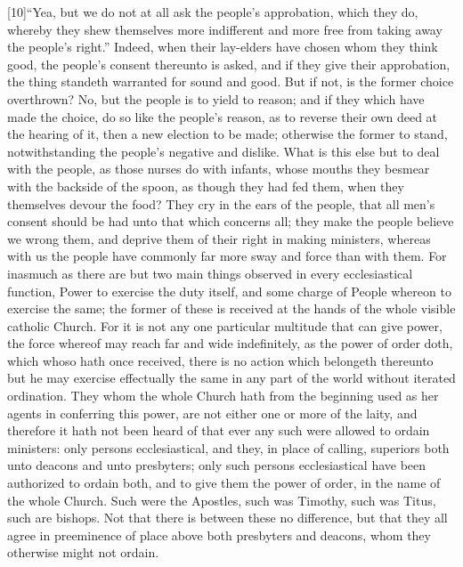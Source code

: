 [10]“Yea, but we do not at all ask the people’s approbation,  which they do, whereby they shew themselves more indifferent and more free from taking away the people’s right.” Indeed, when their lay-elders have chosen whom they think good, the people’s consent thereunto is asked, and if they give their approbation, the thing standeth warranted for sound and good. But if not, is the former choice overthrown? No, but the people is to yield to reason; and if they which have made the choice, do so like the people’s reason, as to reverse their own deed at the hearing of it, then a new election to be made; otherwise the former to stand, notwithstanding the people’s negative and dislike. What is this else but to deal with the people, as those nurses do with infants, whose mouths they besmear with the backside of the spoon, as though they had fed them, when they themselves devour the food? They cry in the ears of the people, that all men’s consent should be had unto that which concerns all; they make the people believe we wrong them, and deprive them of their right in making ministers, whereas with us the people have commonly far more sway and force than with them. For inasmuch as there are but two main things observed in every ecclesiastical function, Power to exercise the duty itself, and some charge of People whereon to exercise the same; the former of these is received at the hands of the whole visible catholic Church. For it is not any one particular multitude that can give power, the force whereof may reach far and wide indefinitely, as the power of order doth, which whoso hath once received, there is no action which belongeth thereunto but he may exercise effectually the same in any part of the world without iterated  ordination. They whom the whole Church hath from the beginning used as her agents in conferring this power, are not either one or more of the laity, and therefore it hath not been heard of that ever any such were allowed to ordain ministers: only persons ecclesiastical, and they, in place of calling, superiors both unto deacons and unto presbyters; only such persons ecclesiastical have been authorized to ordain both, and to give them the power of order, in the name of the whole Church. Such were the Apostles, such was Timothy, such was Titus, such are bishops. Not that there is between these no difference, but that they all agree in preeminence of place above both presbyters and deacons, whom they otherwise might not ordain.

